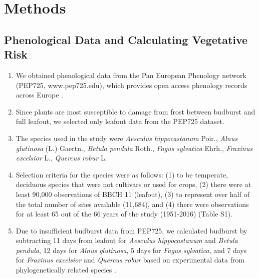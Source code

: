 \documentclass{article}\usepackage[]{graphicx}\usepackage[]{color}
\begin{document}
\section*{Methods}
\subsection*{Phenological Data and Calculating Vegetative Risk}
\begin{enumerate}
\item We obtained phenological data from the Pan European Phenology network (PEP725, www.pep725.edu), which provides open access phenology records across Europe \citep{Templ2018}.
\item Since plants are most susceptible to damage from frost between budburst and full leafout, we selected only leafout data \citep[i.e., in][BBCH 11, which is defined as the point of leaf unfolding and the first visible leaf stalk]{Meier2001} from the PEP725 dataset.
\item The species used in the study were \textit{Aesculus hippocastanum} Poir., \textit{Alnus glutinosa} (L.) Gaertn., \textit{Betula pendula} Roth., \textit{Fagus sylvatica} Ehrh., \textit{Fraxinus excelsior} L., \textit{Quercus robur} L.
\item Selection criteria for the species were as follows: (1) to be temperate, deciduous species that were not cultivars or used for crops, (2) there were at least 90,000 observations of BBCH 11 (leafout), (3) to represent over half of the total number of sites available (11,684), and (4) there were observations for at least 65 out of the 66 years of the study (1951-2016) (Table S1). %
\item Due to insufficient budburst data from PEP725, we calculated budburst by subtracting 11 days from leafout for \textit{Aesculus hippocastanum} and \textit{Betula pendula}, 12 days for \textit{Alnus glutinosa}, 5 days for \textit{Fagus sylvatica}, and 7 days for \textit{Fraxinus excelsior} and \textit{Quercus robur} based on experimental data from phylogenetically related species \citep{Buerki2010, Wang2016, Hipp2017, Flynn2018}.
\end{enumerate}
\end{document}
